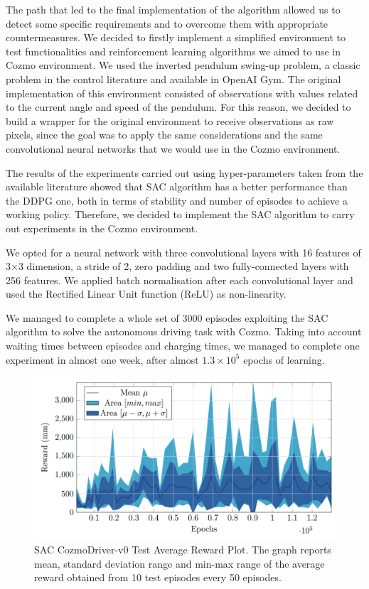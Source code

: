 \documentclass[10pt,twocolumn,letterpaper]{article}
\begin{document}
The path that led to the final implementation of the algorithm allowed us to detect some specific requirements and to overcome them with appropriate countermeasures.
We decided to firstly implement a simplified environment to test functionalities and reinforcement learning algorithms we aimed to use in Cozmo environment. We used the inverted pendulum swing-up problem, a classic problem in the control literature and available in OpenAI Gym. 
The original implementation of this environment consisted of observations with values related to the current angle and speed of the pendulum. For this reason, we decided to build a wrapper for the original environment to receive observations as raw pixels, since the goal was to apply the same considerations and the same convolutional neural networks that we would use in the Cozmo environment.

The results of the experiments carried out using hyper-parameters taken from the available literature showed that SAC algorithm has a better performance than the DDPG one, both in terms of stability and number of episodes to achieve a working policy. Therefore, we decided to implement the SAC algorithm to carry out experiments in the Cozmo environment.

We opted for a neural network with three convolutional layers with 16 features of 3$\times$3 dimension, a stride of 2, zero padding and two fully-connected layers with 256 features.
We applied batch normalisation after each convolutional layer and used the Rectified Linear Unit function (ReLU) as non-linearity.

We managed to complete a whole set of 3000 episodes exploiting the SAC algorithm to solve the autonomous driving task with Cozmo.
Taking into account waiting times between episodes and charging times, we managed to complete one experiment in almost one week, after almost $1.3\times 10^5$ epochs of learning.

\begin{figure}[tbp]
    \centering
    \includegraphics[width=0.97\columnwidth]{test_confidence.png}
    \caption[SAC CozmoDriver-v0 Test Average Reward Plot]{SAC CozmoDriver-v0 Test Average Reward Plot. The graph reports mean, standard deviation range and min-max range of the average reward obtained from 10 test episodes every 50 episodes.}
    \label{confidence}
\end{figure}
\end{document}
